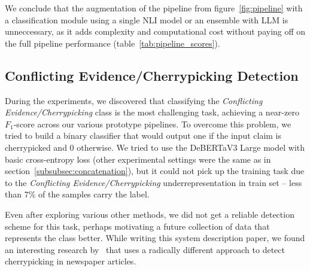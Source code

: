 We conclude that the augmentation of the pipeline from figure~\ref{fig:pipeline} with a classification module using a single NLI model or an ensemble with LLM is unneccessary, as it adds complexity and computational cost without paying off on the full pipeline performance (table~\ref{tab:pipeline_scores}).

\subsection{Conflicting Evidence/Cherrypicking Detection}

During the experiments, we discovered that classifying the \textit{Conflicting Evidence/Cherrypicking} class is the most challenging task, achieving a near-zero $F_1$-score across our various prototype pipelines.
To overcome this problem, we tried to build a binary classifier that would output one if the input claim is cherrypicked and 0 otherwise. We tried to use the DeBERTaV3 Large model with basic cross-entropy loss (other experimental settings were the same as in section~\ref{subsubsec:concatenation}), but it could not pick up the training task due to the \textit{Conflicting Evidence/Cherrypicking} underrepresentation in train set -- less than 7\% of the samples carry the label. 

Even after exploring various other methods, we did not get a reliable detection scheme for this task, perhaps motivating a future collection of data that represents the class better.
While writing this system description paper, we found an interesting research by~\citet{jaradat2024contextawaredetectioncherrypickingnews} that uses a radically different approach to detect cherrypicking in newspaper articles.
